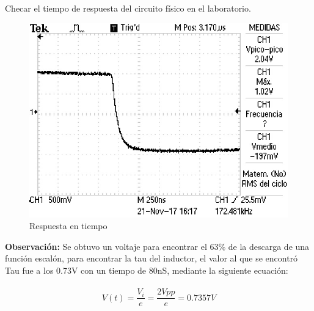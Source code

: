 \documentclass[12pt,letterpaper]{article}     %
\begin{document}
Checar el tiempo de respuesta del circuito físico en el laboratorio.\\
\begin{figure}[h!]
\centering
\includegraphics[width=5in]{TEK0044}
\caption{Respuesta en tiempo}
\end{figure}

\textbf{Observación:}
Se obtuvo un voltaje para encontrar el 63\% de la descarga de una función escalón, para encontrar la tau del inductor, el valor al que se encontró Tau fue a los 0.73V con un tiempo de 80nS, mediante la siguiente ecuación:\\\\
\begin{equation}\label{eq:ej11}
V(t)=\frac{V_{i}}{e}=\frac{2Vpp}{e}=0.7357V
\end{equation}
\newpage


\end{document}
